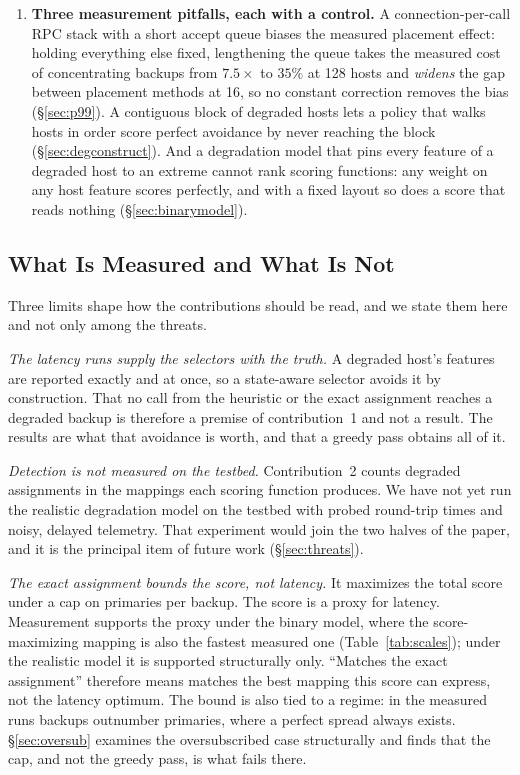 \documentclass[journal]{IEEEtran}
\begin{document}
\begin{enumerate}
\item \textbf{Three measurement pitfalls, each with a control.} A
connection-per-call RPC stack with a short accept queue biases the measured
placement effect: holding everything else fixed, lengthening the queue takes the
measured cost of concentrating backups from $7.5\times$ to $35\%$ at 128 hosts
and \emph{widens} the gap between placement methods at 16, so no constant
correction removes the bias (\S\ref{sec:p99}). A contiguous block of degraded
hosts lets a policy that walks hosts in order score perfect avoidance by never
reaching the block (\S\ref{sec:degconstruct}). And a degradation model that
pins every feature of a degraded host to an extreme cannot rank scoring
functions: any weight on any host feature scores perfectly, and with a fixed
layout so does a score that reads nothing (\S\ref{sec:binarymodel}).
\end{enumerate}

\subsection{What Is Measured and What Is Not}
\label{sec:scope}

Three limits shape how the contributions should be read, and we state them
here and not only among the threats.

\emph{The latency runs supply the selectors with the truth.} A degraded host's
features are reported exactly and at once, so a state-aware selector avoids it
by construction. That no call from the heuristic or the exact assignment
reaches a degraded backup is therefore a premise of contribution~1 and not a
result. The results are what that avoidance is worth, and that a greedy pass
obtains all of it.

\emph{Detection is not measured on the testbed.} Contribution~2 counts degraded
assignments in the mappings each scoring function produces. We have not yet run
the realistic degradation model on the testbed with probed round-trip times and
noisy, delayed telemetry. That experiment would join the two halves of the
paper, and it is the principal item of future work (\S\ref{sec:threats}).

\emph{The exact assignment bounds the score, not latency.} It maximizes the
total score under a cap on primaries per backup. The score is a proxy for
latency. Measurement supports the proxy under the binary model, where the
score-maximizing mapping is also the fastest measured one
(Table~\ref{tab:scales}); under the realistic model it is supported
structurally only. ``Matches the exact assignment'' therefore means matches the
best mapping this score can express, not the latency optimum. The bound is
also tied to a regime: in the measured runs backups outnumber primaries, where
a perfect spread always exists. \S\ref{sec:oversub} examines the oversubscribed
case structurally and finds that the cap, and not the greedy pass, is what
fails there.
\end{document}
